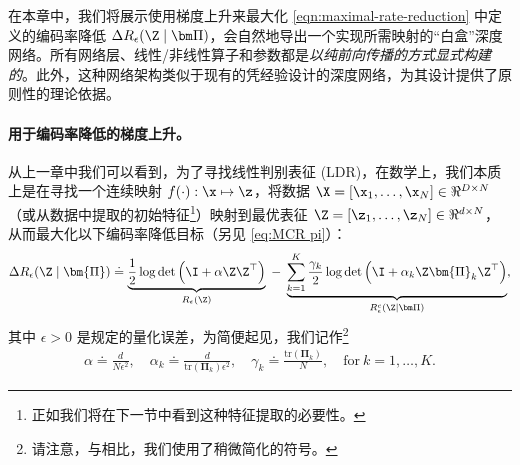 \documentclass[../../book-main_zh.tex]{subfiles}
\begin{document}
在本章中，我们将展示使用梯度上升来最大化 \eqref{eqn:maximal-rate-reduction} 中定义的编码率降低 $\Delta R_{\epsilon}(\Z \mid \bm \Pi)$，会自然地导出一个实现所需映射的“白盒”深度网络。所有网络层、线性/非线性算子和参数都是{\em 以纯前向传播的方式显式构建的}。此外，这种网络架构类似于现有的凭经验设计的深度网络，为其设计提供了原则性的理论依据。

\paragraph{用于编码率降低的梯度上升。} 从上一章中我们可以看到，为了寻找线性判别表征 (LDR)，在数学上，我们本质上是在寻找一个连续映射 $f(\cdot): \x \mapsto \z$，将数据 $\X = [\x_1, \ldots, \x_N] \in \Re^{D \times N}$（或从数据中提取的初始特征\footnote{正如我们将在下一节中看到这种特征提取的必要性。}）映射到最优表征 $\Z = [\z_1, \ldots, \z_N] \in \Re^{d \times N}$，从而最大化以下编码率降低目标（另见 \eqref{eq:MCR pi}）：
\begin{equation}\label{eq:mcr-formulation}
    \begin{split}
        \Delta R_{\epsilon}(\Z \mid \bm{\Pi}) \doteq
        \underbrace{\frac{1}{2}\log\det \Big(\I + {\alpha} \Z
        \Z^{\top} \Big)}_{R_{\epsilon}(\Z)} \;-\;
        \underbrace{\sum_{k=1}^{K}\frac{\gamma_{k}}{2}
            \log\det\Big(\I + {\alpha_{k}} \Z \bm{\Pi}_{k} \Z^{\top}
        \Big)}_{R_{\epsilon}^c(\Z \mid \bm \Pi)},
    \end{split}
\end{equation}
其中 $\epsilon > 0$ 是规定的量化误差，为简便起见，我们记作\footnote{请注意，与相比，我们使用了稍微简化的符号。}
\begin{align*}
    \alpha \doteq \frac{d}{N\epsilon^2}, \quad \alpha_{k} \doteq
    \frac{d}{\mathrm{tr}(\bm{\Pi}_{k})\epsilon^2}, \quad \gamma_{k}
    \doteq \frac{\mathrm{tr}(\bm{\Pi}_{k})}{N}, \quad \text{for}\ k
    = 1,\ldots, K.
\end{align*}
\end{document}
